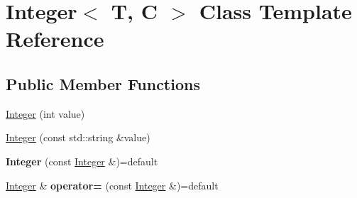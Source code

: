 \hypertarget{classInteger}{\section{Integer$<$ T, C $>$ Class Template Reference}
\label{classInteger}
}
\subsection*{Public Member Functions}
\begin{DoxyCompactItemize}
\item 
\hyperlink{classInteger_a1d5315e4ec5b56b8cb3a6991d514f7d6}{Integer} (int value)
\item 
\hyperlink{classInteger_afebf72d47413ceedcc30b74c3055b771}{Integer} (const std\-::string \&value)
\item 
\hypertarget{classInteger_a318c3792cdf17c63eece6d8b55b66ae5}{{\bfseries Integer} (const \hyperlink{classInteger}{Integer} \&)=default}\label{classInteger_a318c3792cdf17c63eece6d8b55b66ae5}

\item 
\hypertarget{classInteger_a65590e7093729050f2f77f9df359a16a}{\hyperlink{classInteger}{Integer} \& {\bfseries operator=} (const \hyperlink{classInteger}{Integer} \&)=default}\label{classInteger_a65590e7093729050f2f77f9df359a16a}


\end{DoxyCompactItemize}
